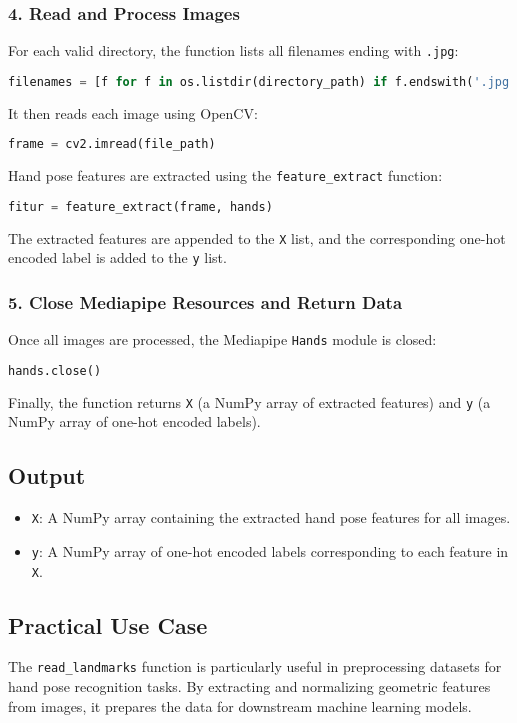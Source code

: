 \subsubsection*{4. Read and Process Images}
For each valid directory, the function lists all filenames ending with \texttt{.jpg}:
\begin{lstlisting}[language=Python]
	filenames = [f for f in os.listdir(directory_path) if f.endswith('.jpg')]
\end{lstlisting}
It then reads each image using OpenCV:
\begin{lstlisting}[language=Python]
	frame = cv2.imread(file_path)
\end{lstlisting}
Hand pose features are extracted using the \texttt{feature\_extract} function:
\begin{lstlisting}[language=Python]
	fitur = feature_extract(frame, hands)
\end{lstlisting}
The extracted features are appended to the \texttt{X} list, and the corresponding one-hot encoded label is added to the \texttt{y} list.

\subsubsection*{5. Close Mediapipe Resources and Return Data}
Once all images are processed, the Mediapipe \texttt{Hands} module is closed:
\begin{lstlisting}[language=Python]
	hands.close()
\end{lstlisting}
Finally, the function returns \texttt{X} (a NumPy array of extracted features) and \texttt{y} (a NumPy array of one-hot encoded labels).

\subsection*{Output}
\begin{itemize}
	\item \texttt{X}: A NumPy array containing the extracted hand pose features for all images.
	\item \texttt{y}: A NumPy array of one-hot encoded labels corresponding to each feature in \texttt{X}.
\end{itemize}

\subsection*{Practical Use Case}
The \texttt{read\_landmarks} function is particularly useful in preprocessing datasets for hand pose recognition tasks. By extracting and normalizing geometric features from images, it prepares the data for downstream machine learning models.


